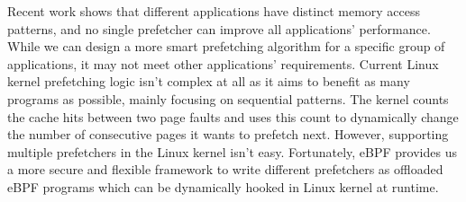 Recent work shows that different applications have distinct memory access patterns, and no single prefetcher can improve all applications’ performance. While we can design a more smart prefetching algorithm for a specific group of applications, it may not meet other applications’ requirements. Current Linux kernel prefetching logic isn’t complex at all as it aims to benefit as many programs as possible, mainly focusing on sequential patterns. The kernel counts the cache hits between two page faults and uses this count to dynamically change the number of consecutive pages it wants to prefetch next. However, supporting multiple prefetchers in the Linux kernel isn’t easy. Fortunately, eBPF provides us a more secure and flexible framework to write different prefetchers as offloaded eBPF programs which can be dynamically hooked in Linux kernel at runtime.